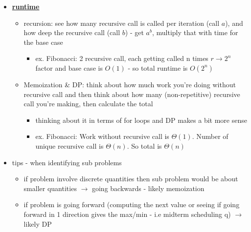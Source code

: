 \begin{itemize}
    \item \ul{\textbf{runtime}}
    \begin{itemize}[leftmargin = 1em]
        \item recursion: see how many recursive call is called per iteration (call $a$), and how deep the recursive call (call $b$) - get $a^b$, multiply that with time for the base case
        \begin{itemize}[leftmargin = 1em]
            \item ex. Fibonacci: 2 recursive call, each getting called n times $r\rightarrow 2^n$ factor and base case is $O(1)$ - so total runtime is $O(2^n)$
        \end{itemize}
    
        \item Memoization \& DP: think about how much work you're doing without recursive call and then think about how many (non-repetitive) recursive call you're making, then calculate the total 
        \begin{itemize}[leftmargin = 1em]
            \item thinking about it in terms of for loops and DP makes a bit more sense
            \item ex. Fibonacci: Work without recursive call is $\Theta(1)$. Number of unique recursive call is $\Theta(n)$. So total is $\Theta(n)$ 
        \end{itemize}
    \end{itemize}
    \vfill \null \columnbreak
    \item tips - when identifying sub problems
    \begin{itemize}[leftmargin = 1em]
        \item if problem involve discrete quantities then sub problem would be about smaller quantities $\rightarrow$ going backwards - likely memoization
        \item if problem is going forward (computing the next value or seeing if going forward in 1 direction gives the max/min - i.e midterm scheduling q) $\rightarrow$ likely DP
    \end{itemize}
\end{itemize}

